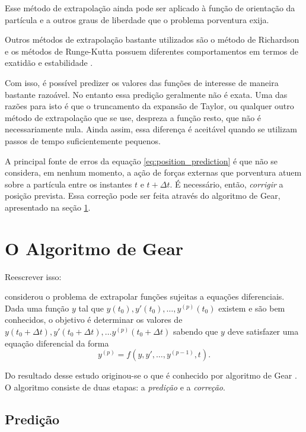 Esse método de extrapolação ainda pode ser aplicado à função de orientação da partícula e a outros graus de liberdade que o problema porventura exija.

Outros métodos de extrapolação bastante utilizados são o método de Richardson e os métodos de Runge-Kutta possuem diferentes comportamentos em termos de exatidão e estabilidade .

Com isso, é possível predizer os valores das funções de interesse de maneira bastante razoável. No entanto essa predição geralmente não é exata. Uma das razões para isto é que o truncamento da expansão de Taylor, ou qualquer outro método de extrapolação que se use, despreza a função resto, que não é necessariamente nula. Ainda assim, essa diferença é aceitável quando se utilizam passos de tempo suficientemente pequenos. 

A principal fonte de erros da equação \eqref{eq:position_prediction} é que não se considera, em nenhum momento, a ação de forças externas que porventura atuem sobre a partícula entre os instantes \(t\) e \(t + \Delta t\). É necessário, então, \textit{corrigir} a posição prevista. Essa correção pode ser feita através do algoritmo de Gear, apresentado na seção \ref{sec:gear_integration_scheme}.

\section{O Algoritmo de Gear} \label{sec:gear_integration_scheme}

\alert{Reescrever isso:}

 considerou o problema de extrapolar funções sujeitas a equações diferenciais. Dada uma função \(y\) tal que \(y(t_0), y'(t_0),\dots, y^{(p)}(t_0)\) existem e são bem conhecidos, o objetivo é determinar os valores de \(y(t_0 + \Delta t), y'(t_0 + \Delta t),\dots y^{(p)}(t_0 + \Delta t)\) sabendo que \(y\) deve satisfazer uma equação diferencial da forma
\begin{equation*}
	y^{(p)} = f(y, y',\dots,y^{(p-1)}, t).
\end{equation*}

Do resultado desse estudo originou-se o que é conhecido por algoritmo de Gear . O algoritmo consiste de duas etapas: a \textit{predição} e a \textit{correção}.

\subsection{Predição}


